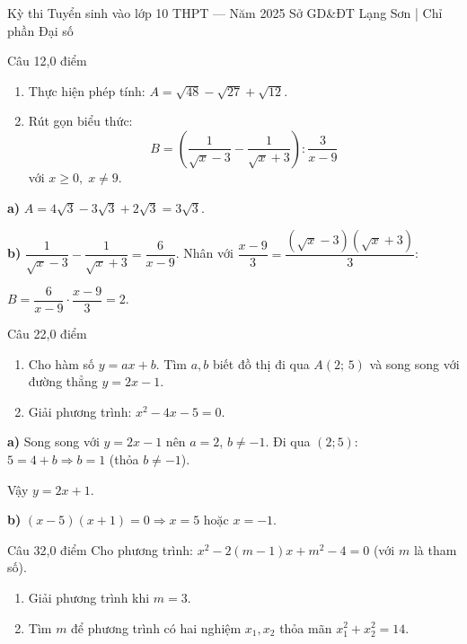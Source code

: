 ﻿%
%
  {Kỳ thi Tuyển sinh vào lớp 10 THPT — Năm 2025}%
  {Sở GD\&ĐT Lạng Sơn | Chỉ phần Đại số}

\begin{de_cau}{Câu 1}{2,0 điểm}
\begin{enumerate}[label=\alph*)]
  \item Thực hiện phép tính: $A = \sqrt{48} - \sqrt{27} + \sqrt{12}$.
  \item Rút gọn biểu thức:
  \[B = \left(\dfrac{1}{\sqrt{x}-3} - \dfrac{1}{\sqrt{x}+3}\right) : \dfrac{3}{x-9}\]
  với $x \ge 0,\; x \neq 9$.
\end{enumerate}
\end{de_cau}

\begin{loi_giai_cau}
\textbf{a)} $A = 4\sqrt{3} - 3\sqrt{3} + 2\sqrt{3} = \boxed{3\sqrt{3}}$.

\textbf{b)} $\dfrac{1}{\sqrt{x}-3}-\dfrac{1}{\sqrt{x}+3}=\dfrac{6}{x-9}$. Nhân với $\dfrac{x-9}{3}=\dfrac{(\sqrt{x}-3)(\sqrt{x}+3)}{3}$:

$B = \dfrac{6}{x-9}\cdot\dfrac{x-9}{3} = \boxed{2}$.
\end{loi_giai_cau}

\begin{de_cau}{Câu 2}{2,0 điểm}
\begin{enumerate}[label=\alph*)]
  \item Cho hàm số $y = ax + b$. Tìm $a, b$ biết đồ thị đi qua $A(2;\,5)$ và song song với đường thẳng $y = 2x - 1$.
  \item Giải phương trình: $x^2 - 4x - 5 = 0$.
\end{enumerate}
\end{de_cau}

\begin{loi_giai_cau}
\textbf{a)} Song song với $y=2x-1$ nên $a=2$, $b\neq-1$. Đi qua $(2;5)$: $5=4+b \Rightarrow b=1$ (thỏa $b\neq-1$).

Vậy $\boxed{y = 2x+1}$.

\textbf{b)} $(x-5)(x+1)=0 \Rightarrow \boxed{x=5}$ hoặc $\boxed{x=-1}$.
\end{loi_giai_cau}

\begin{de_cau}{Câu 3}{2,0 điểm}
Cho phương trình: $x^2 - 2(m-1)x + m^2 - 4 = 0$ (với $m$ là tham số).
\begin{enumerate}[label=\alph*)]
  \item Giải phương trình khi $m = 3$.
  \item Tìm $m$ để phương trình có hai nghiệm $x_1, x_2$ thỏa mãn $x_1^2 + x_2^2 = 14$.
\end{enumerate}
\end{de_cau}


